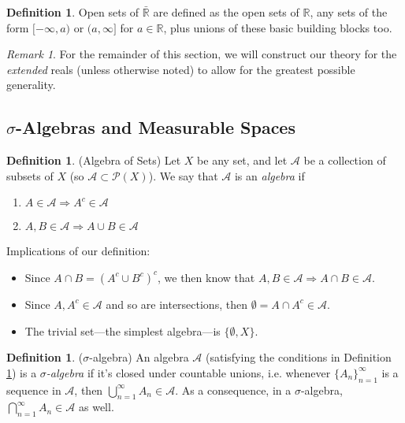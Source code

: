 \documentclass[12pt]{article}
\theoremstyle{plain}
\theoremstyle{definition}
\newtheorem{defn}[thm]{Definition}
\theoremstyle{remark}
\newtheorem*{rmk}{Remark}
\begin{document}
\begin{defn}
Open sets of $\bar{\mathbb{R}}$ are defined as the open sets of $\mathbb{R}$, any sets of the form $[-\infty, a)$ or $(a,\infty]$ for $a\in\mathbb{R}$, plus unions of these basic building blocks too.
\end{defn}

\begin{rmk}
For the remainder of this section, we will construct our theory for the \emph{extended} reals (unless otherwise noted) to allow for the greatest possible generality.
\end{rmk}

\subsection{$\sigma$-Algebras and Measurable Spaces}

\begin{defn}
\label{algebra}
(Algebra of Sets)
Let $X$ be any set, and let $\mathscr{A}$ be a collection of subsets of $X$ (so $\mathscr{A}\subset\mathscr{P}(X)$). We say that $\mathscr{A}$ is an \emph{algebra} if 
\begin{enumerate}
    \item $A\in\mathscr{A}\Rightarrow A^c\in\mathscr{A}$
    \item $A,B\in\mathscr{A} \Rightarrow A\cup B\in\mathscr{A}$
\end{enumerate}
Implications of our definition:
\begin{itemize}
    \item Since $A\cap B = (A^c \cup B^c)^c$, we then know that $A,B\in\mathscr{A}\Rightarrow A\cap B\in \mathscr{A}$.
    \item Since $A, A^c \in \mathscr{A}$ and so are intersections, then $\emptyset = A\cap A^c \in \mathscr{A}$.
    \item The trivial set---the simplest algebra---is $\{\emptyset, X\}$.
\end{itemize}
\end{defn}

\begin{defn} 
($\sigma$-algebra)
An algebra $\mathscr{A}$ (satisfying the conditions in Definition \ref{algebra}) is a \emph{$\sigma$-algebra} if it's closed under countable unions,  i.e. whenever $\{A_n\}^\infty_{n=1}$ is a sequence in $\mathscr{A}$, then $\bigcup^\infty_{n=1} A_n \in \mathscr{A}$. As a consequence, in a $\sigma$-algebra, $\bigcap^\infty_{n=1} A_n \in \mathscr{A}$ as well.
\end{defn}
\end{document}
